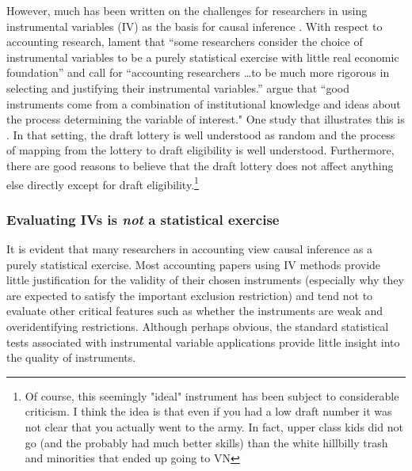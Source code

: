 \documentclass[11pt]{amsart}
\begin{document}
However, much has been written on the challenges for researchers in using instrumental variables (IV) as the basis for causal inference \citep[e.g.,][]{Roberts:2013cz}. 
With respect to accounting research, \citet{Larcker:2010fq} lament that ``some researchers consider the choice of instrumental variables to be a purely statistical exercise with little real economic foundation'' and call for 
``accounting researchers \dots to be much more rigorous in selecting and justifying their instrumental variables.'' 
\citet[p.117]{Angrist:2008vk} argue that ``good instruments come from a combination of institutional knowledge and ideas about the process determining the variable of interest."
One study that illustrates this is \cite{Angrist:2008vk}.
In that setting, the draft lottery is well understood as random and the process of mapping from the lottery to draft eligibility is well understood.
Furthermore, there are good reasons to believe that the draft lottery does not affect anything else directly except for draft eligibility.\footnote {Of course, this seemingly "ideal" instrument has been subject to considerable criticism. I think the idea is that even if you had a low draft number it was not clear that you actually went to the army.  In fact, upper class kids did not go (and the probably had much better skills) than the white hillbilly trash and minorities that ended up going to VN}



\subsubsection{Evaluating IVs is \emph{not} a statistical exercise}
It is evident that many researchers in accounting view causal inference as a purely statistical exercise.
Most accounting papers using IV methods provide little justification for the validity of their chosen instruments (especially why they are expected to satisfy the important exclusion restriction) and tend not to evaluate other critical features such as whether the instruments are weak and overidentifying restrictions. Although perhaps obvious, the standard statistical tests associated with instrumental variable applications provide little insight into the quality of instruments.  

\end{document}
